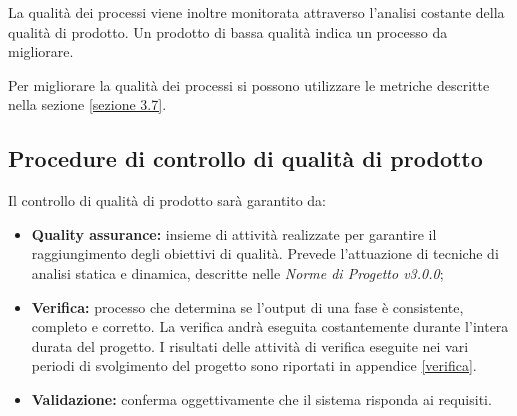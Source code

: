 \noindent La qualità dei processi viene inoltre monitorata attraverso l'analisi costante della qualità di prodotto. Un prodotto di bassa qualità indica un processo da migliorare.

\noindent Per migliorare la qualità dei processi si possono utilizzare le metriche descritte nella sezione \ref{sezione 3.7}.

\subsection{Procedure di controllo di qualità di prodotto}
Il controllo di qualità di prodotto sarà garantito da:
\begin{itemize}
	\item \textbf{Quality assurance:} insieme di attività realizzate per garantire il raggiungimento degli obiettivi di qualità. Prevede l'attuazione di tecniche di analisi statica e dinamica, descritte nelle \textit{Norme di Progetto v3.0.0};
	\item \textbf{Verifica:} processo che determina se l'output di una fase è consistente, completo e corretto. La verifica andrà eseguita costantemente durante l'intera durata del progetto. I risultati delle attività di verifica eseguite nei vari periodi di svolgimento del progetto sono riportati in appendice \ref{verifica}.
	\item \textbf{Validazione:} conferma oggettivamente che il sistema risponda ai requisiti.
\end{itemize}

